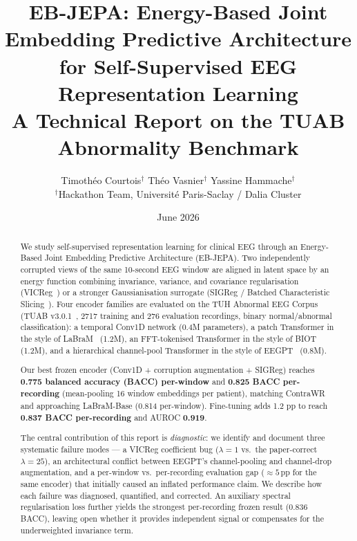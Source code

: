 \documentclass[11pt,a4paper]{article}
\title{\LARGE\bfseries EB-JEPA: Energy-Based Joint Embedding Predictive Architecture\\
for Self-Supervised EEG Representation Learning\\[4pt]
{\large A Technical Report on the TUAB Abnormality Benchmark}}
\author{
  Timoth\'eo Courtois$^{\dagger}$ \quad
  Th\'eo Vasnier$^{\dagger}$ \quad
  Yassine Hammache$^{\dagger}$\\[4pt]
  \small$^{\dagger}$Hackathon Team, Universit\'e Paris-Saclay / Dalia Cluster
}
\date{June 2026}
\begin{document}
\maketitle

\begin{abstract}
We study self-supervised representation learning for clinical EEG through an
Energy-Based Joint Embedding Predictive Architecture (EB-JEPA).  Two independently
corrupted views of the same 10-second EEG window are aligned in latent space by an
energy function combining invariance, variance, and covariance regularisation
(VICReg~\cite{vicreg}) or a stronger Gaussianisation surrogate
(SIGReg / Batched Characteristic Slicing~\cite{epps1983}).
Four encoder families are evaluated on the TUH Abnormal EEG Corpus
(TUAB v3.0.1~\cite{tuab}, 2717 training and 276 evaluation recordings,
binary normal/abnormal classification):
a temporal Conv1D network (0.4M parameters), a patch Transformer in the style of
LaBraM~\cite{labram} (1.2M), an FFT-tokenised Transformer in the style of
BIOT~\cite{biot} (1.2M), and a hierarchical channel-pool Transformer in the
style of EEGPT~\cite{eegpt} (0.8M).

Our best frozen encoder (Conv1D + corruption augmentation + SIGReg) reaches
\textbf{0.775 balanced accuracy (BACC) per-window} and \textbf{0.825 BACC per-recording}
(mean-pooling 16 window embeddings per patient), matching ContraWR and approaching
LaBraM-Base (0.814 per-window).  Fine-tuning adds 1.2 pp to reach \textbf{0.837 BACC
per-recording} and AUROC \textbf{0.919}.

The central contribution of this report is \emph{diagnostic}:
we identify and document three systematic failure modes ---
a VICReg coefficient bug ($\lambda{=}1$ vs.\ the paper-correct $\lambda{=}25$),
an architectural conflict between EEGPT's channel-pooling and channel-drop
augmentation, and a per-window vs.\ per-recording evaluation gap
(${\approx}5$\,pp for the same encoder) that initially caused an inflated
performance claim.  We describe how each failure was diagnosed, quantified, and
corrected.  An auxiliary spectral regularisation loss further yields the strongest
per-recording frozen result (0.836 BACC), leaving open whether it provides
independent signal or compensates for the underweighted invariance term.
\end{abstract}

\tableofcontents
\newpage
\end{document}
